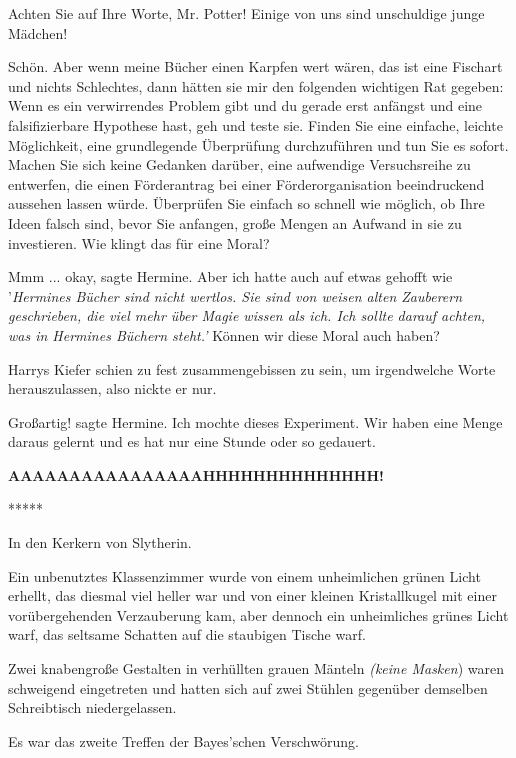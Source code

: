 \glqq{}Achten Sie auf Ihre Worte, Mr. Potter! Einige von uns sind unschuldige
junge Mädchen!\grqq{}

\glqq{}Schön. Aber wenn meine Bücher einen Karpfen wert wären, das ist eine
Fischart und nichts Schlechtes, dann hätten sie mir den folgenden wichtigen Rat
gegeben: Wenn es ein verwirrendes Problem gibt und du gerade erst anfängst und
eine falsifizierbare Hypothese hast, geh und teste sie. Finden Sie eine
einfache, leichte Möglichkeit, eine grundlegende Überprüfung durchzuführen und
tun Sie es sofort. Machen Sie sich keine Gedanken darüber, eine aufwendige
Versuchsreihe zu entwerfen, die einen Förderantrag bei einer Förderorganisation
beeindruckend aussehen lassen würde. Überprüfen Sie einfach so schnell wie
möglich, ob Ihre Ideen falsch sind, bevor Sie anfangen, große Mengen an Aufwand
in sie zu investieren. Wie klingt das für eine Moral?\grqq{}

\glqq{}Mmm ... okay\grqq{}, sagte Hermine. \glqq{}Aber ich hatte auch auf etwas
gehofft wie '\emph{Hermines Bücher sind nicht wertlos. Sie sind von weisen alten
Zauberern geschrieben, die viel mehr über Magie wissen als ich. Ich sollte
darauf achten, was in Hermines Büchern steht.'} Können wir diese Moral auch
haben?\grqq{}

Harrys Kiefer schien zu fest zusammengebissen zu sein, um irgendwelche Worte
herauszulassen, also nickte er nur.

\glqq{}Großartig!\grqq{} sagte Hermine. \glqq{}Ich mochte dieses Experiment. Wir
haben eine Menge daraus gelernt und es hat nur eine Stunde oder so
gedauert.\grqq{}

\textbf{\glqq{}AAAAAAAAAAAAAAAAHHHHHHHHHHHHHH!\grqq{}}

\begin{center}*****\end{center}

In den Kerkern von Slytherin.

Ein unbenutztes Klassenzimmer wurde von einem unheimlichen grünen Licht erhellt,
das diesmal viel heller war und von einer kleinen Kristallkugel mit einer
vorübergehenden Verzauberung kam, aber dennoch ein unheimliches grünes Licht
warf, das seltsame Schatten auf die staubigen Tische warf.

Zwei knabengroße Gestalten in verhüllten grauen Mänteln \emph{(keine Masken})
waren schweigend eingetreten und hatten sich auf zwei Stühlen gegenüber
demselben Schreibtisch niedergelassen.

Es war das zweite Treffen der Bayes'schen Verschwörung.

